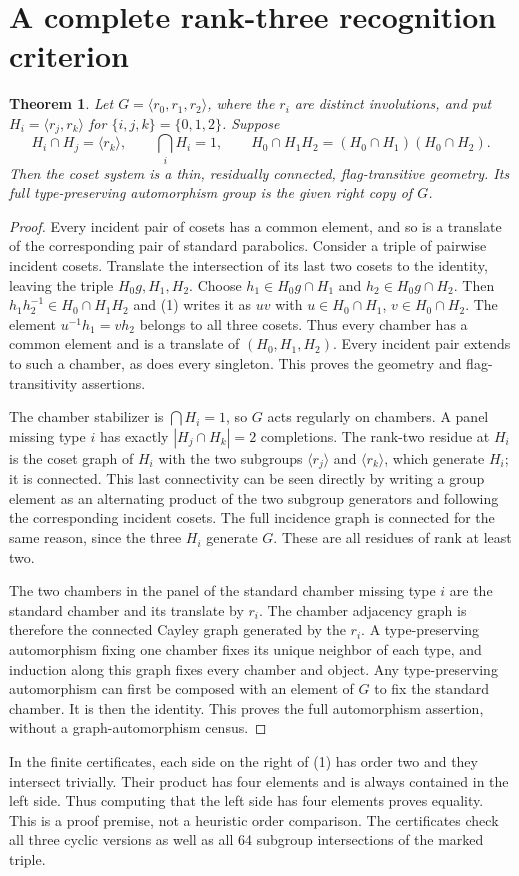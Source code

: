 \documentclass[11pt,a4paper]{article}
\newtheorem{theorem}{Theorem}\newtheorem{lemma}[theorem]{Lemma}\newtheorem{proposition}[theorem]{Proposition}
\newcommand{\gen}[1]{\langle #1\rangle}
\begin{document}
\section{A complete rank-three recognition criterion}
\begin{theorem}\label{recognition}
Let $G=\gen{r_0,r_1,r_2}$, where the $r_i$ are distinct involutions, and put
$H_i=\gen{r_j,r_k}$ for $\{i,j,k\}=\{0,1,2\}$. Suppose
\[
 H_i\cap H_j=\gen{r_k},\qquad \bigcap_iH_i=1,
 \qquad H_0\cap H_1H_2=(H_0\cap H_1)(H_0\cap H_2). \tag{1}
\]
Then the coset system is a thin, residually connected, flag-transitive
geometry. Its full type-preserving automorphism group is the given right
copy of $G$.
\end{theorem}
\begin{proof}
Every incident pair of cosets has a common element, and so is a translate
of the corresponding pair of standard parabolics. Consider a triple of
pairwise incident cosets. Translate the intersection of its last two cosets
to the identity, leaving the triple $H_0g,H_1,H_2$. Choose
$h_1\in H_0g\cap H_1$ and $h_2\in H_0g\cap H_2$.
Then $h_1h_2^{-1}\in H_0\cap H_1H_2$ and (1) writes it as $uv$ with
$u\in H_0\cap H_1$, $v\in H_0\cap H_2$.
The element $u^{-1}h_1=vh_2$ belongs to all three cosets. Thus every
chamber has a common element and is a translate of $(H_0,H_1,H_2)$.
Every incident pair extends to such a chamber, as does every singleton.
This proves the geometry and flag-transitivity assertions.

The chamber stabilizer is $\bigcap H_i=1$, so $G$ acts regularly on chambers.
A panel missing type $i$ has exactly $|H_j\cap H_k|=2$ completions.
The rank-two residue at $H_i$ is the coset graph of $H_i$ with the two
subgroups $\gen{r_j}$ and $\gen{r_k}$, which generate $H_i$; it is connected.
This last connectivity can be seen directly by writing a group element as
an alternating product of the two subgroup generators and following the
corresponding incident cosets. The full incidence graph is connected for
the same reason, since the three $H_i$ generate $G$. These are all residues
of rank at least two.

The two chambers in the panel of the standard chamber missing type $i$
are the standard chamber and its translate by $r_i$. The chamber adjacency
graph is therefore the connected Cayley graph generated by the $r_i$.
A type-preserving automorphism fixing one chamber fixes its unique neighbor
of each type, and induction along this graph fixes every chamber and object.
Any type-preserving automorphism can first be composed with an element of
$G$ to fix the standard chamber. It is then the identity. This proves the
full automorphism assertion, without a graph-automorphism census.
\end{proof}
In the finite certificates, each side on the right of (1) has order two
and they intersect trivially. Their product has four elements and is always
contained in the left side. Thus computing that the left side has four
elements proves equality. This is a proof premise, not a heuristic order
comparison. The certificates check all three cyclic versions as well as all
64 subgroup intersections of the marked triple.
\end{document}
